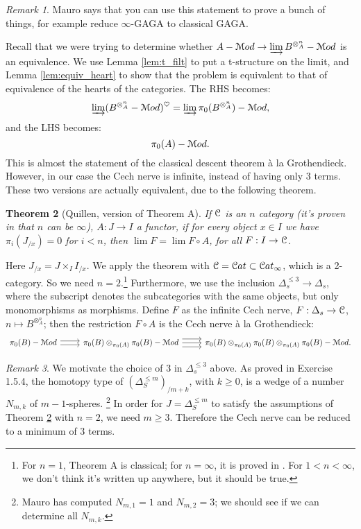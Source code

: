 \documentclass[10pt,a4paper,reqno,oneside]{book} %
\theoremstyle{plain}
\newtheorem{thm}{Theorem}[section]
\theoremstyle{definition}
\theoremstyle{remark}
\newtheorem{rem}[thm]{Remark}
\numberwithin{equation}{section}
\begin{document}
\begin{rem}
Mauro says that you can use this statement to prove a bunch of things, for example reduce $\infty$-GAGA to classical GAGA.
\end{rem}

Recall that we were trying to determine whether $A-\mathcal M od \to \varinjlim B^{\otimes_A^{n}} - \mathcal M od$ is an equivalence. We use
Lemma \ref{lem:t_filt} to put a t-structure on the limit, and Lemma \ref{lem:equiv_heart} to show that the problem is equivalent
to that of equivalence of the hearts of the categories. The RHS
becomes:
\[	\varinjlim (B^{\otimes_A^{n}} - \mathcal M od)^{\heartsuit} = \varinjlim \pi_0(B^{\otimes_A^{n}}) - \mathcal M od ,	\]
and the LHS becomes:
\[	\pi_0(A)- \mathcal M od.	\]
This is almost the statement of the classical descent theorem \`{a} la Grothendieck. However, 
in our case the Cech nerve is infinite, instead of having only 3 terms. These two versions are actually
equivalent, due to the following theorem. 

\begin{thm}[Quillen, version of Theorem A]
\label{thm:A}
If $\mathcal C$ is an $n$ category (it's proven in \cite{HTT} that $n$ can be $\infty$), $A : J \to I$ a functor,
if for every object $x \in I$ we have $\pi_i(J_{/x}) = 0$ for $i<n$, then $\lim F = \lim F \circ A$, for all $F : I \to \mathcal C$.
\end{thm}

Here $J_{/x} = J \times_I I_{/x}$. We apply the theorem with $\mathcal C = \mathcal C at \subset \mathcal C at_{\infty}$, which is a 2-category. 
So we need $n=2$.\footnote{For $n=1$, Theorem A is classical; for $n=\infty$, it is proved in \cite{HTT}. For $1<n<\infty$,
we don't think it's written up anywhere, but it should be true.} Furthermore, we use the inclusion $\Delta_s^{\leq 3} \to
\Delta_s$, where the subscript denotes the subcategories with the same objects, but only monomorphisms as morphisms. Define
$F$ as the infinite Cech nerve, $F : \Delta_s \to \mathcal C$, $n \mapsto B^{\otimes_A^n}$; then the restriction $F \circ A$ is
the Cech nerve \`a la Grothendieck:
\[
\begin{tikzcd}
\pi_0(B) - \cM od \arrow[shift left]{r}\arrow[shift right]{r} & \pi_0(B) \otimes_{\pi_0(A)} \pi_0(B) -\cM od
\arrow[shift left = 2]{r}\arrow{r}\arrow[shift right = 2]{r} & \pi_0(B) \otimes_{\pi_0(A)} \pi_0(B) \otimes_{\pi_0(A)} \pi_0(B)
-\cM od .
\end{tikzcd}
\]


\begin{rem}
We motivate the choice of 3 in $\Delta_s^{\leq 3}$ above.
As proved in Exercise 1.5.4, the homotopy type of $(\Delta^{\leq m}_S)_{/m+k}$, with $k\geq 0$,
is a wedge of a number $N_{m,k}$ of $m-1$-spheres. \footnote{Mauro has computed $N_{m,1} = 1$ and $N_{m,2}= 3$; we should see
if we can determine all $N_{m,k}$.} In order for $J = \Delta^{\leq m}_S$ to satisfy the assumptions of Theorem \ref{thm:A} with
$n=2$, we need $m\geq 3$. Therefore the Cech nerve can be reduced to a minimum of 3 terms.
\end{rem}
\end{document}
